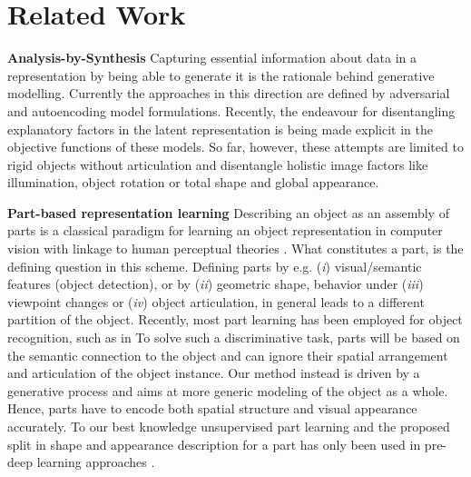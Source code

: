 \section{Related Work}

\textbf{Analysis-by-Synthesis} Capturing essential information about data in a representation by being able to generate it is the rationale behind generative modelling. Currently the approaches in this direction are defined by adversarial \cite{Goodfellow:2014td} and autoencoding \cite{Kingma:2013tz} model formulations. Recently, the endeavour for disentangling explanatory factors in the latent representation is being made explicit in the objective functions \cite{Burgess:2018uf, Chen:2016tp} of these models. So far, however, these attempts are limited to rigid objects without articulation and disentangle holistic image factors like illumination, object rotation or total shape and global appearance.  \ %

\textbf{Part-based representation learning} Describing an object as an assembly of parts is a classical paradigm for learning an object representation in computer vision \cite{Ross:2006uc} with linkage to human perceptual theories \cite{Biederman:1987tc}. What constitutes a part, is the defining question in this scheme. Defining parts by e.g. (\emph{i}) visual/semantic features (object detection), or by (\emph{ii}) geometric shape, behavior under (\emph{iii}) viewpoint changes or (\emph{iv}) object articulation, in general leads to a different partition of the object. Recently, most part learning has been employed for object recognition, such as in \cite{Felzenszwalb:2010ve, Novotny:2017ta, Singh:2012un, Mesnil:2013hi, Yang:2016uo, Lam:2017ta} %
To solve such a discriminative task, parts will be based on the semantic connection to the object and can ignore their spatial arrangement and articulation of the object instance. Our method instead is driven by a generative process and aims at more generic modeling of the object as a whole. Hence, parts have to encode both spatial structure and visual appearance accurately. To our best knowledge unsupervised part learning and the proposed split in shape and appearance description for a part has only been used in pre-deep learning approaches \cite{Ross:2006uc, Nguyen:2013vk, Cootes:1998tn}. \

